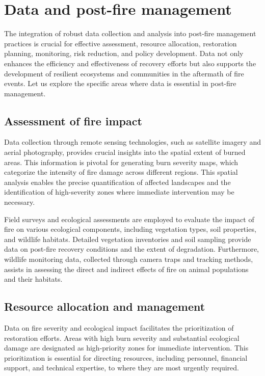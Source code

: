 \documentclass[
  12 pt,
]{Nemilov}
\begin{document}
\section{Data and post-fire management}\label{data-and-post-fire-management}

The integration of robust data collection and analysis into post-fire management practices is crucial for effective assessment, resource allocation, restoration planning, monitoring, risk reduction, and policy development. Data not only enhances the efficiency and effectiveness of recovery efforts but also supports the development of resilient ecosystems and communities in the aftermath of fire events. Let us explore the specific areas where data is essential in post-fire management.

\subsection{Assessment of fire impact}\label{assessment-of-fire-impact}

Data collection through remote sensing technologies, such as satellite imagery and aerial photography, provides crucial insights into the spatial extent of burned areas. This information is pivotal for generating burn severity maps, which categorize the intensity of fire damage across different regions. This spatial analysis enables the precise quantification of affected landscapes and the identification of high-severity zones where immediate intervention may be necessary.

Field surveys and ecological assessments are employed to evaluate the impact of fire on various ecological components, including vegetation types, soil properties, and wildlife habitats. Detailed vegetation inventories and soil sampling provide data on post-fire recovery conditions and the extent of degradation. Furthermore, wildlife monitoring data, collected through camera traps and tracking methods, assists in assessing the direct and indirect effects of fire on animal populations and their habitats.

\subsection{Resource allocation and management}\label{resource-allocation-and-management}

Data on fire severity and ecological impact facilitates the prioritization of restoration efforts. Areas with high burn severity and substantial ecological damage are designated as high-priority zones for immediate intervention. This prioritization is essential for directing resources, including personnel, financial support, and technical expertise, to where they are most urgently required.
\end{document}
